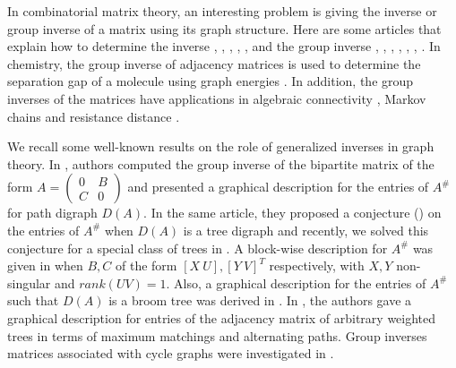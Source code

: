 \documentclass[notitlepage,12pt,reqno]{amsart}
\numberwithin{equation}{section}
\begin{document}
In combinatorial matrix theory, an interesting problem is giving the inverse or group inverse of a matrix using its graph structure. Here are some articles that explain how to determine the inverse \cite{akbari}, \cite{ghorbani}, \cite{sms}, \cite{car}, \cite{klein}, \cite{sj} and the group inverse \cite{bov}, \cite{encinas}, \cite{cov}, \cite{mdp}, \cite{maca}, \cite{nandi}, \cite{pavsi}. In chemistry, the group inverse of adjacency matrices is used to determine the separation gap of a molecule using graph energies \cite{sn}.
In addition, the group inverses of the matrices have applications in algebraic connectivity \cite{kirkland}, Markov chains \cite{campbell} and resistance distance \cite{bu}.

We recall some well-known results on the role of generalized inverses in graph theory. In \cite[Theorem 2.2]{cov}, authors computed the group inverse of the bipartite matrix of the form $A=\begin{pmatrix}
0 & B\\
C & 0
\end{pmatrix}$ and presented a graphical description for the entries of $A^{\#}$ for path digraph $D(A)$. In the same article, they proposed a conjecture (\cite[Conjecture 5.1]{cov}) on the entries of $A^{\#}$ when $D(A)$ is a tree digraph and recently, we solved this conjecture for a special class of trees in \cite[Theorem 2.11]{nandi}. A block-wise description for $A^{\#}$ was given in \cite[Theorem 2.1]{mdp} when $B,C$ of the form $[X\ U], [Y\ V]^T$ respectively, with $X,Y$ non-singular and $rank(UV)=1$. Also, a graphical description for the entries of $A^{\#}$ such that $D(A)$ is a broom tree was derived in \cite{mdp}. In \cite{pavsi}, the authors gave a graphical description for entries of the adjacency matrix of arbitrary weighted trees in terms of maximum matchings and alternating paths. Group inverses matrices associated with cycle graphs were investigated in \cite{mona,maca,sn,sivakumar}.
\end{document}
